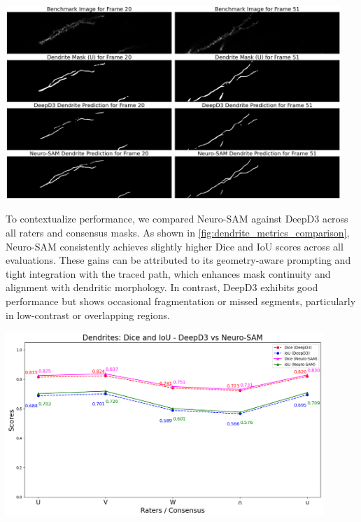 \begin{center}
\includegraphics[width=0.95\textwidth]{figures/37_compare_frame_masks.png}
\label{fig:compare_frame_masks}
\end{center}

To contextualize performance, we compared Neuro-\gls{SAM} against \gls{DeepD3} across all raters and consensus masks. As shown in \autoref{fig:dendrite_metrics_comparison}, Neuro-\gls{SAM} consistently achieves slightly higher Dice and \gls{IoU} scores across all evaluations. These gains can be attributed to its geometry-aware prompting and tight integration with the traced path, which enhances mask continuity and alignment with dendritic morphology. In contrast, \gls{DeepD3} exhibits good performance but shows occasional fragmentation or missed segments, particularly in low-contrast or overlapping regions.

\begin{center}
\includegraphics[width=0.9\textwidth]{figures/45_dendrite_metrics_comparison.png}
\label{fig:dendrite_metrics_comparison}
\end{center}



